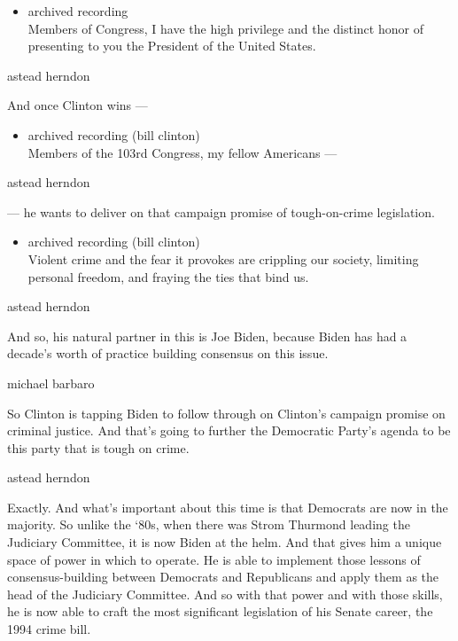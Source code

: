 \begin{itemize}
\tightlist
\item
  archived recording\\
  Members of Congress, I have the high privilege and the distinct honor
  of presenting to you the President of the United States.
\end{itemize}

astead herndon

And once Clinton wins ---

\begin{itemize}
\tightlist
\item
  archived recording (bill clinton)\\
  Members of the 103rd Congress, my fellow Americans ---
\end{itemize}

astead herndon

--- he wants to deliver on that campaign promise of tough-on-crime
legislation.

\begin{itemize}
\tightlist
\item
  archived recording (bill clinton)\\
  Violent crime and the fear it provokes are crippling our society,
  limiting personal freedom, and fraying the ties that bind us.
\end{itemize}

astead herndon

And so, his natural partner in this is Joe Biden, because Biden has had
a decade's worth of practice building consensus on this issue.

michael barbaro

So Clinton is tapping Biden to follow through on Clinton's campaign
promise on criminal justice. And that's going to further the Democratic
Party's agenda to be this party that is tough on crime.

astead herndon

Exactly. And what's important about this time is that Democrats are now
in the majority. So unlike the `80s, when there was Strom Thurmond
leading the Judiciary Committee, it is now Biden at the helm. And that
gives him a unique space of power in which to operate. He is able to
implement those lessons of consensus-building between Democrats and
Republicans and apply them as the head of the Judiciary Committee. And
so with that power and with those skills, he is now able to craft the
most significant legislation of his Senate career, the 1994 crime bill.


